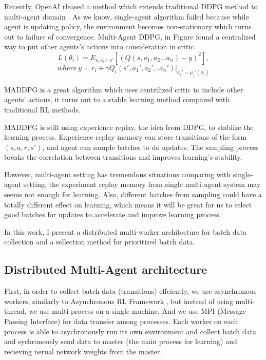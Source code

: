 \documentclass[11pt,twocolumn]{jarticle} %
\begin{document}
Recently, OpenAI rleased a method which extends traditional DDPG method to multi-agent domain \cite{maddpg}. As we know, single-agent algorithm failed because while agent is updating policy, the environment becomes non-stationary which turns out to failure of convergence. Multi-Agent DDPG, in Figure \label{fig:maddpg} found a centralized way to put other agents's actions into consideration in critic.
\begin{equation}
L(\theta_i) = E_{s,a,r,s'}[(Q(s, a_1, a_2 ... a_n) - y)^2],  
\end{equation}
$$where\ y = r_i + \gamma{Q_i}(s', a_1', a_2' ... a_n') | _{a_j'=\mu_j'(o_j)}$$

MADDPG is a great algorithm which uses centrilized critic to include other agents' actions, it turns out to a stable learning method compared with traditional RL methods. \par

MADDPG is still using experience replay, the idea from DDPG, to stablize the learning process. Experience replay \cite{replay} memory can store transitions of the form $(s,a,r,s')$, and agent can sample batches to do updates. The sampling process breaks the correlation between transitions and improves learning's stability. \par

However, multi-agent setting has tremendous situations comparing with single-agent setting, the experiment replay memory from single multi-agent system may seems not enough for learning. Also, different batches from sampling could have a totally different effect on learning, which means it will be great for us to select good batches for updates to accelerate and improve learning process. \par

In this work, I present a distributed multi-worker architecture for batch data collection and a sellection method for prioritized batch data.


\subsection{Distributed Multi-Agent architecture}

First, in order to collect batch data (transitions) effciently, we use asynchronous workers, similarly to Asynchronous RL Framework \cite{a3c}, but instead of using multi-thread, we use multi-process on a single machine. And we use MPI (Message Passing Interface) for data transfer among processes. Each worker on each process is able to asychronously run its own environment and collect batch data and sychronously send data to master (the main process for learning) and recieving nerual network weights from the master. \par
\end{document}
